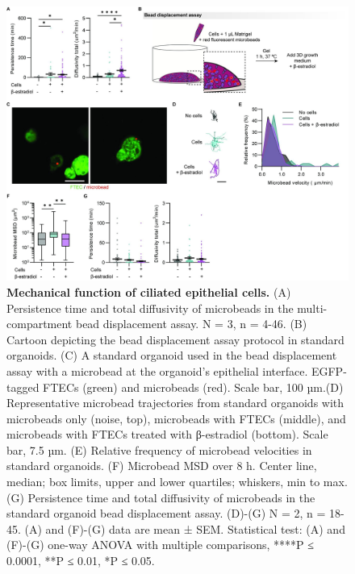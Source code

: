 \begin{refsection}

    \begin{figure}[p]
        \begin{center}
            \includegraphics[width=1\textwidth,height=0.85\textheight,keepaspectratio,clip,page=1]{figures/chapter4/fig_S4.jpg}
            \captionsetup{font=small}
            \caption{\textbf{Mechanical function of ciliated epithelial cells.} (A) Persistence time and total diffusivity of microbeads in the multi-compartment bead displacement assay. N = 3, n = 4-46. (B) Cartoon depicting the bead displacement assay protocol in standard organoids. (C) A standard organoid used in the bead displacement assay with a microbead at the organoid’s epithelial interface. EGFP-tagged FTECs (green) and microbeads (red). Scale bar, 100 µm.(D) Representative microbead trajectories from standard organoids with microbeads only (noise, top), microbeads with FTECs (middle), and microbeads with FTECs treated with β-estradiol (bottom). Scale bar, 7.5 µm. (E) Relative frequency of microbead velocities in standard organoids. (F) Microbead MSD over 8 h. Center line, median; box limits, upper and lower quartiles; whiskers, min to max. (G) Persistence time and total diffusivity of microbeads in the standard organoid bead displacement assay. (D)-(G) N = 2, n = 18-45. (A) and (F)-(G) data are mean ± SEM. Statistical test: (A) and (F)-(G) one-way ANOVA with multiple comparisons, ****P ≤ 0.0001, **P ≤ 0.01, *P ≤ 0.05. }
            \label{chapter4_figS4}
        \end{center}
    \end{figure}
    

\end{refsection}
